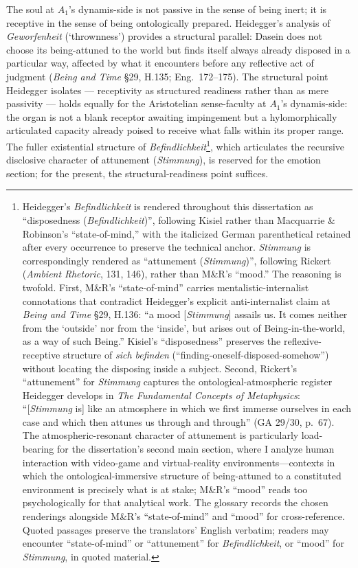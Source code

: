 \documentclass{article}
\begin{document}
The soul at $A_1$'s dynamis-side is not passive in the sense of being inert; it is receptive in the sense of being ontologically prepared. Heidegger's analysis of \textit{Geworfenheit} (`thrownness') provides a structural parallel: Dasein does not choose its being-attuned to the world but finds itself always already disposed in a particular way, affected by what it encounters before any reflective act of judgment (\textit{Being and Time} \S 29, H.135; Eng.~172--175). The structural point Heidegger isolates --- receptivity as structured readiness rather than as mere passivity --- holds equally for the Aristotelian sense-faculty at $A_1$'s dynamis-side: the organ is not a blank receptor awaiting impingement but a hylomorphically articulated capacity already poised to receive what falls within its proper range. The fuller existential structure of \textit{Befindlichkeit}\footnote{Heidegger's \textit{Befindlichkeit} is rendered throughout this dissertation as ``disposedness (\textit{Befindlichkeit})'', following Kisiel rather than Macquarrie \& Robinson's ``state-of-mind,'' with the italicized German parenthetical retained after every occurrence to preserve the technical anchor. \textit{Stimmung} is correspondingly rendered as ``attunement (\textit{Stimmung})'', following Rickert (\textit{Ambient Rhetoric}, 131, 146), rather than M\&R's ``mood.'' The reasoning is twofold. First, M\&R's ``state-of-mind'' carries mentalistic-internalist connotations that contradict Heidegger's explicit anti-internalist claim at \textit{Being and Time} \S 29, H.136: ``a mood [\textit{Stimmung}] assails us. It comes neither from the `outside' nor from the `inside', but arises out of Being-in-the-world, as a way of such Being.'' Kisiel's ``disposedness'' preserves the reflexive-receptive structure of \textit{sich befinden} (``finding-oneself-disposed-somehow'') without locating the disposing inside a subject. Second, Rickert's ``attunement'' for \textit{Stimmung} captures the ontological-atmospheric register Heidegger develops in \textit{The Fundamental Concepts of Metaphysics}: ``[\textit{Stimmung} is] like an atmosphere in which we first immerse ourselves in each case and which then attunes us through and through'' (GA 29/30, p.~67). The atmospheric-resonant character of attunement is particularly load-bearing for the dissertation's second main section, where I analyze human interaction with video-game and virtual-reality environments---contexts in which the ontological-immersive structure of being-attuned to a constituted environment is precisely what is at stake; M\&R's ``mood'' reads too psychologically for that analytical work. The glossary records the chosen renderings alongside M\&R's ``state-of-mind'' and ``mood'' for cross-reference. Quoted passages preserve the translators' English verbatim; readers may encounter ``state-of-mind'' or ``attunement'' for \textit{Befindlichkeit}, or ``mood'' for \textit{Stimmung}, in quoted material.}, which articulates the recursive disclosive character of attunement (\textit{Stimmung}), is reserved for the emotion section; for the present, the structural-readiness point suffices.
\end{document}
